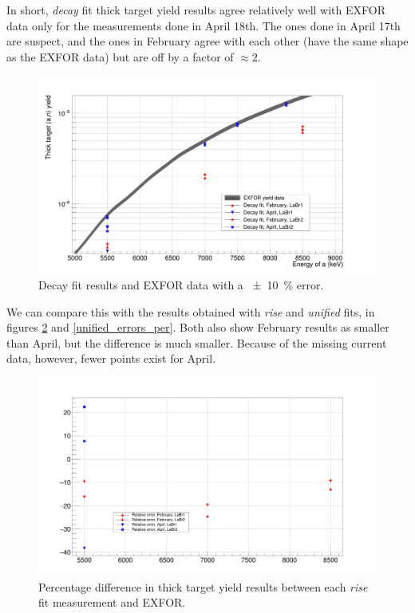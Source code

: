 \documentclass[a4paper,12pt]{report}
\begin{document}
In short, \textit{decay} fit thick target yield results agree relatively well with EXFOR data only for the measurements done in April 18th.
The ones done in April 17th are suspect, and the ones in February agree with each other (have the same shape as the EXFOR data) but are off by a factor of $\approx 2$.

\begin{figure}[H]
	\centering
	\includegraphics[width=\textwidth]{reactions_v_energy_decay.png}
	\caption{Decay fit results and EXFOR data with a \qty{\pm 10}{\percent} error.}
	\label{reactions_v_energy_decay}
\end{figure}

We can compare this with the results obtained with \textit{rise} and \textit{unified} fits, in figures \ref{rise_errors_per} and \ref{unified_errors_per}.
Both also show February results as smaller than April, but the difference is much smaller.
Because of the missing current data, however, fewer points exist for April.

\begin{figure}[H]
	\centering
	\includegraphics[width=\textwidth]{rise_errors_per.png}
	\caption{Percentage difference in thick target yield results between each \textit{rise} fit measurement and EXFOR.}
	\label{rise_errors_per}
\end{figure}
\end{document}
